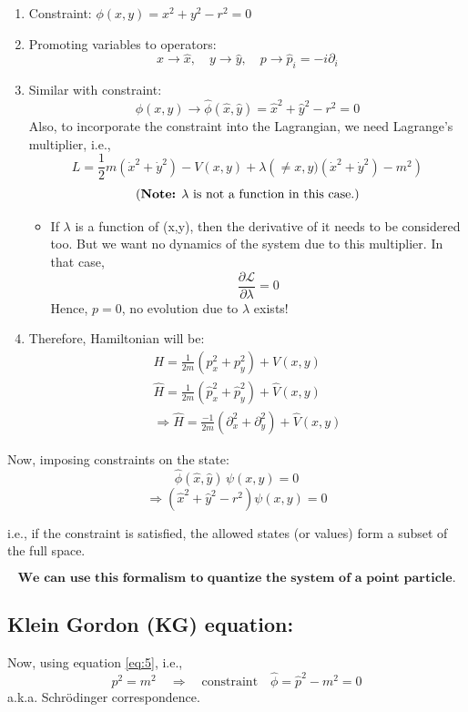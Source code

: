 \documentclass[14pt]{article} %
\begin{document}
\begin{enumerate}
    \item Constraint: \quad $\phi(x,y) = x^2 + y^2 - r^2 = 0$
    \item Promoting variables to operators:
\[
    x \rightarrow \hat{x}, \quad y \rightarrow \hat{y}, \quad p \rightarrow \hat{p}_i = -i \partial_i
\]
    \item Similar with constraint: 
\[
    \phi(x,y) \rightarrow \hat{\phi}(\hat{x},\hat{y}) = \hat{x}^2 + \hat{y}^2 - r^2 = 0
\]
    Also, to incorporate the constraint into the Lagrangian, we need Lagrange's multiplier, i.e.,
\[
L = \frac{1}{2} m (\dot{x}^2 + \dot{y}^2) - V(x,y) + \lambda \left(\neq x,y)(\dot{x}^2 + \dot{y}^2) - m^2 \right)
\]
$$ \text{(\textbf{Note:} $\lambda$ is not a function in this case.)} $$
\begin{itemize}
\item If $\lambda$ is a function of (x,y), then the derivative of it needs to be considered too. But we want no dynamics of the system due to this multiplier. In that case,
\[
\frac{\partial \mathcal{L}}{\partial \lambda} = 0
\]
Hence, $p = 0$, no evolution due to $\lambda$ exists!
\end{itemize}
    
    \item Therefore, Hamiltonian will be:
    \begin{align*}
        H = \frac{1}{2m}\left( p_x^2 + p_y^2 \right) + V(x,y) \tag{7} \label{eq:7} \\
        \hat{H} = \frac{1}{2m}\left( \hat{p}_x^2 + \hat{p}_y^2 \right) + \hat{V}(x,y) \\
        \Rightarrow \hat{H} = \frac{-1}{2m}\left( \partial_x^2 + \partial_y^2 \right) + \hat{V}(x,y)
    \end{align*}
\end{enumerate}
Now, imposing constraints on the state:
\[
\hat{\phi}(\hat{x},\hat{y}) \, \psi(x,y) = 0
\]
\[
\Rightarrow \left( \hat{x}^2 + \hat{y}^2 - r^2 \right) \psi(x,y) = 0
\]

i.e., if the constraint is satisfied, the allowed states (or values) form a subset of the full space.

$$ \textbf{We can use this formalism to quantize the system of a point particle.} $$
\subsection*{Klein Gordon (KG) equation:}
Now, using equation \eqref{eq:5}, i.e.,
\[
p^2 = m^2 \quad \Rightarrow \quad \text{constraint} \quad \hat{\phi} = \hat{p}^2 - m^2 = 0
\]
a.k.a. Schrödinger correspondence.
\end{document}
